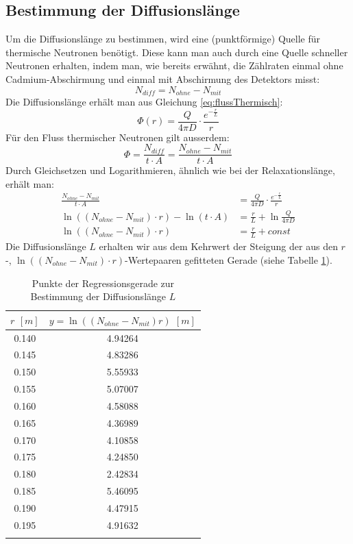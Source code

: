 \documentclass[a4paper,titlepage]{scrartcl}
\numberwithin{equation}{section}
\begin{document}
\subsection{Bestimmung der Diffusionslänge}
\label{subsec:diffusion}
Um die Diffusionslänge zu bestimmen, wird eine (punktförmige) Quelle für thermische Neutronen benötigt. Diese kann man auch durch eine Quelle schneller Neutronen erhalten, indem man, wie bereits erwähnt, die Zählraten einmal ohne Cadmium-Abschirmung und einmal mit Abschirmung des Detektors misst:
\begin{equation*}
N_{diff}=N_{ohne}-N_{mit}
\end{equation*}
Die Diffusionslänge erhält man aus Gleichung \ref{eq:flussThermisch}:
\begin{equation*}
\Phi(r)=\frac{Q}{4 \pi D} \cdot \frac{e^{-\frac{r}{L}}}{r}
\end{equation*}
Für den Fluss thermischer Neutronen gilt ausserdem:
\begin{equation*}
\Phi=\frac{N_{diff}}{t \cdot A}=\frac{N_{ohne}-N_{mit}}{t \cdot A}
\end{equation*}
Durch Gleichsetzen und Logarithmieren, ähnlich wie bei der Relaxationslänge, erhält man:
\begin{align}
\frac{N_{ohne}-N_{mit}}{t \cdot A}&=\frac{Q}{4 \pi D} \cdot \frac{e^{-\frac{r}{L}}}{r}\nonumber\\
\ln{((N_{ohne}-N_{mit}) \cdot r)}-\ln{(t \cdot A)}&=\frac{r}{L}+\ln{\frac{Q}{4 \pi D}}\nonumber\\
\ln{((N_{ohne}-N_{mit}) \cdot r)}&=\frac{r}{L} + const\label{eq:regressionDiffusion}
\end{align}
Die Diffusionslänge $L$ erhalten wir aus dem Kehrwert der Steigung der aus den $r$-, $\ln{((N_{ohne}-N_{mit}) \cdot r)}$-Wertepaaren gefitteten Gerade (siehe Tabelle \ref{tab:regressionDiffusion}).
\begin{longtable}[H]{c|c}
$r$ $[m]$ & $y=\ln{((N_{ohne}-N_{mit}) r)}$ $[m]$\\
\hline
0.140 & 4.94264\\
0.145 & 4.83286 \\
0.150 & 5.55933\\
0.155 & 5.07007\\
0.160 & 4.58088\\
0.165 & 4.36989\\
0.170 & 4.10858\\
0.175 & 4.24850\\
0.180 & 2.42834\\
0.185 & 5.46095\\
0.190 & 4.47915\\
0.195 & 4.91632\\
\caption{Punkte der Regressionsgerade zur Bestimmung der Diffusionslänge $L$}
\label{tab:regressionDiffusion}
\end{longtable}
\end{document}
